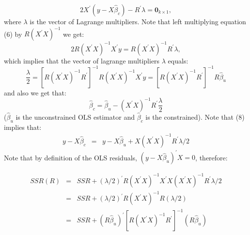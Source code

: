 \documentclass[12] {article}
\begin{document}
\begin{equation}
2 X^{\prime}(y-X\widehat{\beta}_{c}) - R^{\prime} \lambda = \textbf{0}_{k \times 1},
\end{equation}
where $\lambda$ is the vector of Lagrange multipliers. Note that left multiplying equation (6) by $R(X^{\prime}X)^{-1}$ we get:
\[ 2R (X^{\prime} X)^{-1} X^{\prime} y = R (X^{\prime} X )^{-1} R^{\prime} \lambda, \]
which implies that the vector of lagrange multipliers $\lambda$ equals: 
\begin{equation}
\frac{\lambda}{2} = \left[  R (X^{\prime} X )^{-1} R^{\prime} \right]^{-1}R (X^{\prime} X )^{-1} X^{\prime} y = \left[  R (X^{\prime} X )^{-1} R^{\prime} \right]^{-1}R \widehat{\beta}_{u}
\end{equation}
and also we get that:
\begin{equation}
\widehat{\beta}_{c} = \widehat{\beta}_{u} - (X^{\prime}X)^{-1}R^{\prime} \frac{\lambda}{2} 
\end{equation}
\noindent ($\widehat{\beta}_{u}$ is the unconstrained OLS estimator and $\widehat{\beta}_{c}$ is the constrained). Note that (8) implies that:
\begin{eqnarray*}
 y-X\widehat{\beta}_{c} &=& y-X \widehat{\beta}_{u} + X(X^{\prime} X)^{-1}R^{\prime} \lambda/2 
 \end{eqnarray*}
 Note that by definition of the OLS residuals, $(y-X \widehat{\beta}_{u})^{\prime} X = 0$, therefore:
 
\begin{eqnarray*}
SSR(R) &=& SSR + (\lambda/2)^{\prime} R (X^{\prime} X)^{-1} X^{\prime}  X(X^{\prime} X)^{-1}R^{\prime} \lambda/2 \\
&=&  SSR + (\lambda/2)^{\prime} R (X^{\prime} X)^{-1} R (\lambda/2) \\
&=& SSR + (R \widehat{\beta}_{u})^{\prime} \left[  R (X^{\prime} X )^{-1} R^{\prime} \right]^{-1}(R \widehat{\beta}_{u})
\end{eqnarray*}
\end{document}
